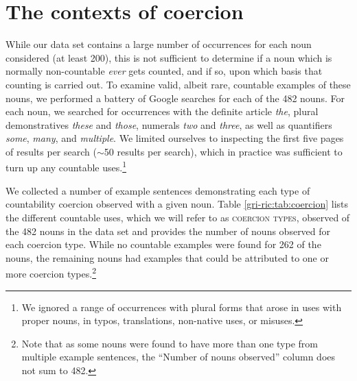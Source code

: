 \documentclass[output=paper]{langscibook}
\begin{document}


\section{The contexts of coercion} \label{gri-ric:sec:coercion}

While our data set contains a large number of occurrences for each noun considered (at least 200), this is not sufficient to determine if a noun which is normally non-countable \textit{ever} gets counted, and if so, upon which basis that counting is carried out.  To examine valid, albeit rare, countable examples of these nouns, we performed a battery of Google searches for each  of the 482 nouns. For each noun, we searched for occurrences with the definite article \emph{the}, plural demonstratives \emph{these} and \emph{those}, numerals \emph{two} and \emph{three}, as well as quantifiers \emph{some}, \emph{many}, and \emph{multiple}. We limited ourselves to inspecting the first five pages of results per search ($\sim$50 results per search), which in practice was sufficient to turn up any countable uses.\footnote{We ignored  a range of occurrences with plural forms that arose in uses with proper nouns, in typos, translations, non-native uses, or misuses.} 

We collected a number of example sentences demonstrating each type of countability coercion observed with a given noun. Table \ref{gri-ric:tab:coercion} lists the different countable uses, which we will refer to as \textsc{coercion types}, observed of the 482 nouns in the data set and provides the number of nouns observed for each coercion type. While no countable examples were found for 262 of the nouns, the remaining nouns had examples that could be attributed to one or more coercion types.\footnote{Note that as some nouns were found to have more than one type from multiple example sentences, the ``Number of nouns observed'' column does not sum to 482.}
\end{document}

